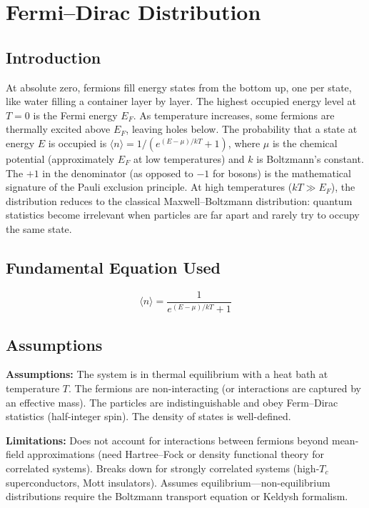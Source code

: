 \chapter{Fermi--Dirac Distribution}

\section*{Introduction}

At absolute zero, fermions fill energy states from the bottom up, one per state, like water filling a container layer by layer. The highest occupied energy level at $T = 0$ is the Fermi energy $E_F$. As temperature increases, some fermions are thermally excited above $E_F$, leaving holes below. The probability that a state at energy $E$ is occupied is $\langle n \rangle = 1/(e^{(E-\mu)/kT} + 1)$, where $\mu$ is the chemical potential (approximately $E_F$ at low temperatures) and $k$ is Boltzmann's constant. The $+1$ in the denominator (as opposed to $-1$ for bosons) is the mathematical signature of the Pauli exclusion principle. At high temperatures ($kT \gg E_F$), the distribution reduces to the classical Maxwell--Boltzmann distribution: quantum statistics become irrelevant when particles are far apart and rarely try to occupy the same state.
\section*{Fundamental Equation Used}

\[
\langle n \rangle = \frac{1}{e^{(E-\mu)/kT}+1}
\]
\section*{Assumptions}

\textbf{Assumptions:} The system is in thermal equilibrium with a heat bath at temperature $T$. The fermions are non-interacting (or interactions are captured by an effective mass). The particles are indistinguishable and obey Ferm--Dirac statistics (half-integer spin). The density of states is well-defined.


\textbf{Limitations:} Does not account for interactions between fermions beyond mean-field approximations (need Hartree--Fock or density functional theory for correlated systems). Breaks down for strongly correlated systems (high-$T_c$ superconductors, Mott insulators). Assumes equilibrium---non-equilibrium distributions require the Boltzmann transport equation or Keldysh formalism.


